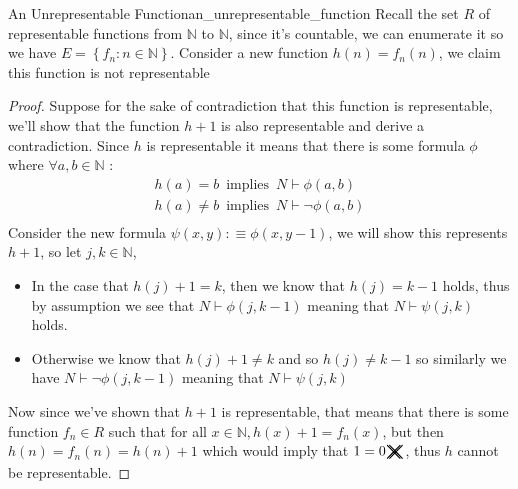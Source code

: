 \begin{example}{An Unrepresentable Function}{an_unrepresentable_function}
Recall  the set \( R \) of representable functions from \( \mathbb{N}  \) to
\( \mathbb{N}  \), since it's countable, we can enumerate it so we have \( E =
\left\{ f _{ n } : n \in \mathbb{N}  \right\}  \). Consider a new function \(
h\left( n \right) = f _{ n } \left( n \right)  \), we claim this function is not
representable
\end{example}
\begin{proof}
   Suppose for the sake of contradiction that this function is representable,
   we'll show that the function \( h +  1 \)  is also representable and derive a
   contradiction. Since \( h \) is representable it means that there is some
   formula \( \phi \) where  \( \forall a, b\in  \mathbb{N} \) :
   \begin{gather*}
       h\left( a \right) =  b \enspace \text{implies} \enspace  N \vdash \phi
       \left( a, b \right) \\
       h\left( a \right) \neq   b \enspace \text{implies} \enspace  N \vdash \neg \phi
       \left( a, b \right) \\
   \end{gather*}
   Consider the new formula \( \psi \left( x, y \right) :\equiv \phi \left( x, y
   -  1\right)  \), we will show this represents \( h + 1 \), so let \( j, k \in
   \mathbb{N} \), 
   \begin{itemize}
       \item In the case that \( h\left( j \right) +  1 = k  \), then we know
       that \( h\left( j \right) = k - 1 \) holds, thus by assumption we see
       that \( N \vdash  \phi \left( j, k - 1 \right)  \) meaning that \( N
       \vdash \psi \left( j, k \right)  \) holds.
       \item Otherwise we know that \( h\left( j \right) +  1 \neq k \) and so
       \( h\left( j \right) \neq k - 1 \) so similarly we have \( N \vdash \neg
       \phi \left( j, k - 1 \right) \) meaning that \( N \vdash \psi \left( j, k \right)  \) 
   \end{itemize}
   Now since we've shown that \( h +  1 \) is representable, that means that
   there is some function \( f _{ n }  \in R \) such that for all \( x \in
   \mathbb{N}, h\left( x \right) + 1 = f _{ n } \left( x \right)   \), but then
   \( h\left( n \right) =  f _{ n } \left( n \right) =  h\left( n \right)  + 1
   \) which would imply that \(  1 = 0 \cont \), thus \( h \) cannot be
   representable.
\end{proof}
